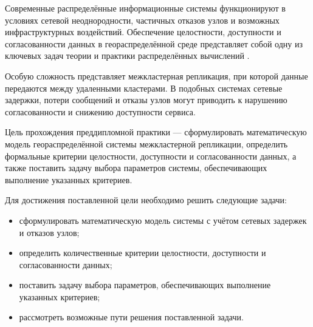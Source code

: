 \introduction

Современные распределённые информационные системы
функционируют в условиях сетевой неоднородности,
частичных отказов узлов и возможных инфраструктурных воздействий.
Обеспечение целостности, доступности и согласованности данных
в геораспределённой среде представляет собой
одну из ключевых задач теории и практики распределённых вычислений
\cite{Tanenbaum2017}.

Особую сложность представляет межкластерная репликация,
при которой данные передаются между удаленными кластерами.
В подобных системах сетевые задержки,
потери сообщений и отказы узлов
могут приводить к нарушению согласованности
и снижению доступности сервиса.

Цель прохождения преддипломной практики —
сформулировать математическую модель геораспределённой системы
межкластерной репликации,
определить формальные критерии
целостности, доступности и согласованности данных,
а также поставить задачу выбора параметров системы,
обеспечивающих выполнение указанных критериев.

Для достижения поставленной цели необходимо решить следующие задачи:
\begin{itemize}
\item сформулировать математическую модель системы
с учётом сетевых задержек и отказов узлов;
\item определить количественные критерии целостности,
доступности и согласованности данных;
\item поставить задачу выбора параметров,
обеспечивающих выполнение указанных критериев;
\item рассмотреть возможные пути решения поставленной задачи.
\end{itemize}
